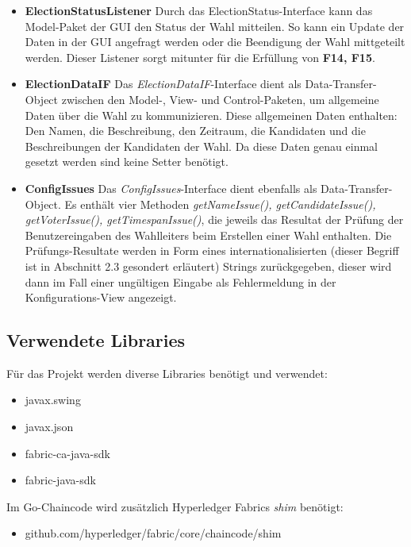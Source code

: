 \documentclass[parskip=full]{scrartcl}
\newcommand{\fakeparagraph}[1]{\textbf{#1}}
\begin{document}
\begin{itemize}
	\item\fakeparagraph{ElectionStatusListener} Durch das ElectionStatus-Interface kann das Model-Paket der GUI den Status der Wahl mitteilen. So kann ein Update der Daten in der GUI angefragt werden oder die Beendigung der Wahl mittgeteilt werden.
	Dieser Listener sorgt mitunter für die Erfüllung von \textbf{F14, F15}.

	\item\fakeparagraph{ElectionDataIF} Das \textit{ElectionDataIF}-Interface dient als Data-Transfer-Object zwischen den Model-, View- und Control-Paketen, um allgemeine Daten über die Wahl zu kommunizieren. Diese allgemeinen Daten enthalten: Den Namen, die Beschreibung, den Zeitraum, die Kandidaten und die Beschreibungen der Kandidaten der Wahl. Da diese Daten genau einmal gesetzt werden sind keine Setter benötigt.

	\item\fakeparagraph{ConfigIssues} Das \textit{ConfigIssues}-Interface dient ebenfalls als Data-Transfer-Object.
	 Es enthält vier Methoden \textit{getNameIssue(), getCandidateIssue(), getVoterIssue(), getTimespanIssue()}, die jeweils das Resultat der Prüfung der Benutzereingaben des Wahlleiters beim Erstellen einer Wahl enthalten. Die Prüfungs-Resultate werden in Form eines internationalisierten (dieser Begriff ist in Abschnitt 2.3 gesondert erläutert) Strings zurückgegeben, dieser wird dann im Fall einer ungültigen Eingabe als Fehlermeldung in der Konfigurations-View angezeigt.

	\end{itemize}

	\subsection{Verwendete Libraries}
	Für das Projekt werden diverse Libraries benötigt und verwendet:
	\begin{itemize}
		\item javax.swing
		\item javax.json
		\item fabric-ca-java-sdk
		\item fabric-java-sdk
	\end{itemize}
	Im Go-Chaincode wird zusätzlich Hyperledger Fabrics \textit{shim} benötigt:
	\begin{itemize}
	\item github.com/hyperledger/fabric/core/chaincode/shim
	\end{itemize}
\end{document}
